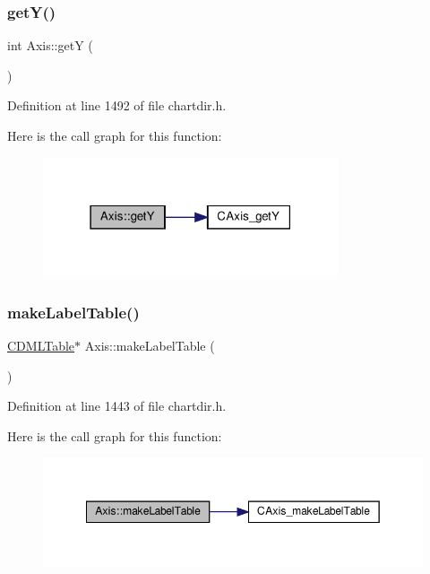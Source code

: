 \subsubsection{\texorpdfstring{get\+Y()}{getY()}}
{\footnotesize\ttfamily int Axis\+::getY (\begin{DoxyParamCaption}{ }\end{DoxyParamCaption})\hspace{0.3cm}{\ttfamily [inline]}}



Definition at line 1492 of file chartdir.\+h.

Here is the call graph for this function\+:
\nopagebreak
\begin{figure}[H]
\begin{center}
\leavevmode
\includegraphics[width=247pt]{class_axis_acad054ebcda8850d3d588ac6ed0c270d_cgraph}
\end{center}
\end{figure}
\mbox{\label{class_axis_afeb924f4756aa7cb704fadf041cd548c}} 
\subsubsection{\texorpdfstring{make\+Label\+Table()}{makeLabelTable()}}
{\footnotesize\ttfamily \hyperlink{class_c_d_m_l_table}{C\+D\+M\+L\+Table}$\ast$ Axis\+::make\+Label\+Table (\begin{DoxyParamCaption}{ }\end{DoxyParamCaption})\hspace{0.3cm}{\ttfamily [inline]}}



Definition at line 1443 of file chartdir.\+h.

Here is the call graph for this function\+:
\nopagebreak
\begin{figure}[H]
\begin{center}
\leavevmode
\includegraphics[width=349pt]{class_axis_afeb924f4756aa7cb704fadf041cd548c_cgraph}
\end{center}
\end{figure}
\mbox{\label{class_axis_af2eb8f9d53b80736a336292d5a8ba0e9}} 
